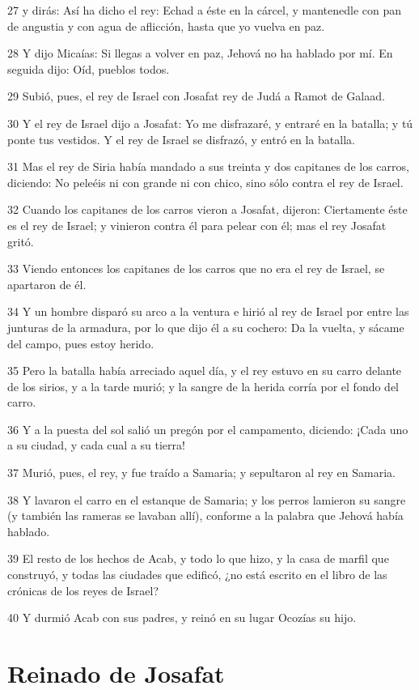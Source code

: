 \par 27 y dirás: Así ha dicho el rey: Echad a éste en la cárcel, y mantenedle con pan de angustia y con agua de aflicción, hasta que yo vuelva en paz.
\par 28 Y dijo Micaías: Si llegas a volver en paz, Jehová no ha hablado por mí. En seguida dijo: Oíd, pueblos todos.
\par 29 Subió, pues, el rey de Israel con Josafat rey de Judá a Ramot de Galaad.
\par 30 Y el rey de Israel dijo a Josafat: Yo me disfrazaré, y entraré en la batalla; y tú ponte tus vestidos. Y el rey de Israel se disfrazó, y entró en la batalla.
\par 31 Mas el rey de Siria había mandado a sus treinta y dos capitanes de los carros, diciendo: No peleéis ni con grande ni con chico, sino sólo contra el rey de Israel.
\par 32 Cuando los capitanes de los carros vieron a Josafat, dijeron: Ciertamente éste es el rey de Israel; y vinieron contra él para pelear con él; mas el rey Josafat gritó.
\par 33 Viendo entonces los capitanes de los carros que no era el rey de Israel, se apartaron de él.
\par 34 Y un hombre disparó su arco a la ventura e hirió al rey de Israel por entre las junturas de la armadura, por lo que dijo él a su cochero: Da la vuelta, y sácame del campo, pues estoy herido.
\par 35 Pero la batalla había arreciado aquel día, y el rey estuvo en su carro delante de los sirios, y a la tarde murió; y la sangre de la herida corría por el fondo del carro.
\par 36 Y a la puesta del sol salió un pregón por el campamento, diciendo: ¡Cada uno a su ciudad, y cada cual a su tierra!
\par 37 Murió, pues, el rey, y fue traído a Samaria; y sepultaron al rey en Samaria.
\par 38 Y lavaron el carro en el estanque de Samaria; y los perros lamieron su sangre (y también las rameras se lavaban allí), conforme a la palabra que Jehová había hablado.
\par 39 El resto de los hechos de Acab, y todo lo que hizo, y la casa de marfil que construyó, y todas las ciudades que edificó, ¿no está escrito en el libro de las crónicas de los reyes de Israel?
\par 40 Y durmió Acab con sus padres, y reinó en su lugar Ocozías su hijo.

\section*{Reinado de Josafat}

